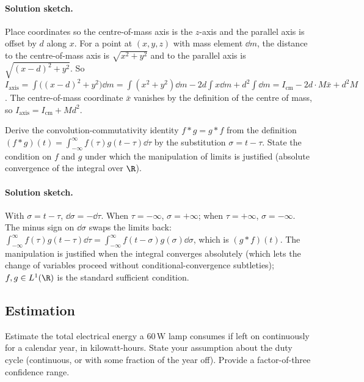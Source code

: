 \paragraph{Solution sketch.}
Place coordinates so the centre-of-mass axis is the $z$-axis and
the parallel axis is offset by $d$ along $x$. For a point at
$(x, y, z)$ with mass element $\dd m$, the distance to the
centre-of-mass axis is $\sqrt{x^{2} + y^{2}}$ and to the parallel
axis is $\sqrt{(x - d)^{2} + y^{2}}$. So $I_{\mathrm{axis}} =
\int\bigl((x - d)^{2} + y^{2}\bigr) \dd m = \int(x^{2} + y^{2})
\dd m - 2d \int x \dd m + d^{2}\int \dd m = I_{\mathrm{cm}} -
2d \cdot M \bar{x} + d^{2} M$. The centre-of-mass coordinate
$\bar{x}$ vanishes by the definition of the centre of mass, so
$I_{\mathrm{axis}} = I_{\mathrm{cm}} + M d^{2}$.

\begin{exercise}
Derive the convolution-commutativity identity $f * g = g * f$ from
the definition $(f * g)(t) = \int_{-\infty}^{\infty} f(\tau) g(t -
\tau) \dd \tau$ by the substitution $\sigma = t - \tau$. State the
condition on $f$ and $g$ under which the manipulation of limits is
justified (absolute convergence of the integral over $\R$).
\end{exercise}

\paragraph{Solution sketch.}
With $\sigma = t - \tau$, $\dd \sigma = -\dd \tau$. When $\tau =
-\infty$, $\sigma = +\infty$; when $\tau = +\infty$, $\sigma =
-\infty$. The minus sign on $\dd \sigma$ swaps the limits back:
$\int_{-\infty}^{\infty} f(\tau) g(t - \tau) \dd \tau =
\int_{-\infty}^{\infty} f(t - \sigma) g(\sigma) \dd \sigma$,
which is $(g * f)(t)$. The manipulation is justified when the
integral converges absolutely (which lets the change of variables
proceed without conditional-convergence subtleties); $f, g \in
L^{1}(\R)$ is the standard sufficient condition.

\subsection*{Estimation}

\begin{exercise}
Estimate the total electrical energy a $60\,\si{\watt}$ lamp consumes
if left on continuously for a calendar year, in kilowatt-hours.
State your assumption about the duty cycle (continuous, or with
some fraction of the year off). Provide a factor-of-three
confidence range.
\end{exercise}

